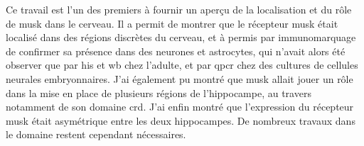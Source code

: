 Ce travail est l'un des premiers à fournir un aperçu de la localisation et du rôle de \gls{musk} dans le cerveau. Il a permit de montrer que le récepteur \gls{musk} était localisé dans des régions discrètes du cerveau, et à permis par immunomarquage de confirmer sa présence dans des neurones et astrocytes, qui n'avait alors été observer que par \gls{his} et \gls{wb} chez l'adulte, et par \gls{qpcr} chez des cultures de cellules neurales embryonnaires. J'ai également pu montré que \gls{musk} allait jouer un rôle dans la mise en place de  plusieurs régions de l'hippocampe, au travers notamment de son domaine \gls{crd}. J'ai enfin montré que l'expression du récepteur \gls{musk} était asymétrique entre les deux hippocampes. De nombreux travaux dans le domaine restent
 cependant nécessaires.